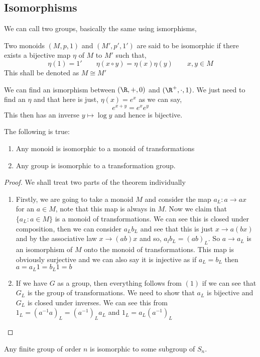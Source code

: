 \subsection{Isomorphisms}
We can call two groups, basically the same using ismorphisms,
\begin{ndefi}[Isomorphism]
  Two monoids $(M, p, 1)$ and $(M', p', 1')$ are said to be isomorphic if there exists a bijective map $\eta$ of $M$ to $M'$ such that,
  $$ \eta(1)=1' \qquad \eta(x\circ y)=\eta(x)\eta(y) \qquad x, y \in M $$
  This shall be denoted as $M \cong M'$
\end{ndefi}

\begin{eg}
  We can find an ismorphism between $(\R, +, 0)$ and $(\R^+, \cdot, 1)$. We just need to find an $\eta$ and that here is just, $\eta(x) = e^x$ as we can say,
  $$ e^{x+y}=e^xe^y $$
  This then has an inverse $y \mapsto \log y$ and hence is bijective.
\end{eg}

\begin{nthm}
  The following is true:
  \begin{enumerate}
    \item Any monoid is isomorphic to a monoid of transformations
    \item Any group is isomorphic to a transformation group.
  \end{enumerate}
\end{nthm}

\begin{proof} We shall treat two parts of the theorem individually
  \begin{enumerate}
    \item Firstly, we are going to take a monoid $M$ and consider the map $a_L : a \to ax$ for an $a \in M$, note that this map is always in $M$. Now we claim that $\{a_L : a \in M\}$ is a monoid of transformations. We can see this is closed under composition, then we can consider $a_Lb_L$ and see that this is just $x \to a (bx)$ and by the associative law $x \to (ab)x$ and so, $a_lb_L = (ab)_L$. So $a \to a_L$ is an isomorphism of $M$ onto the monoid of transformations. This map is obviously surjective and we can also say it is injective as if $a_L = b_L$ then $a = a_L 1 = b_L1 = b$
    \item If we have $G$ as a group, then everything follows from $(1)$ if we can see that $G_L$ is the group of transformations. We need to show that $a_L$ is bijective and $G_L$ is closed under inverses. We can see this from $1_L = (a^{-1}a)_L = (a^{-1})_La_L$ and $1_L = a_L(a^{-1})_L$
  \end{enumerate}
\end{proof}

\begin{ncor}
  Any finite group of order $n$ is isomorphic to some subgroup of $S_n$.
\end{ncor}
